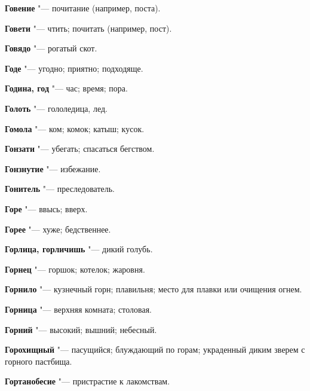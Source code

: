 \begin{mymulticols}{2}
\noindent\textbf{Говение} "--- почитание (например, поста). 




\noindent\textbf{Говети} "--- чтить; почитать (например, пост). 




\noindent\textbf{Говядо} "--- рогатый скот. 




\noindent\textbf{Годе} "--- угодно; приятно; подходяще. 




\noindent\textbf{Година, год} "--- час; время; пора. 




\noindent\textbf{Голоть} "--- гололедица, лед. 




\noindent\textbf{Гомола} "--- ком; комок; катыш; кусок. 




\noindent\textbf{Гонзати} "--- убегать; спасаться бегством. 




\noindent\textbf{Гонзнутие} "--- избежание. 




\noindent\textbf{Гонитель} "--- преследователь. 




\noindent\textbf{Горе} "--- ввысь; вверх. 




\noindent\textbf{Горее} "--- хуже; бедственнее. 




\noindent\textbf{Горлица, горличишь} "--- дикий голубь. 




\noindent\textbf{Горнец} "--- горшок; котелок; жаровня. 




\noindent\textbf{Горнило} "--- кузнечный горн; плавильня; место для плавки или очищения огнем. 




\noindent\textbf{Горница} "--- верхняя комната; столовая. 




\noindent\textbf{Горний} "--- высокий; вышний; небесный. 




\noindent\textbf{Горохищный} "--- пасущийся; блуждающий по горам; украденный диким зверем с горного пастбища. 




\noindent\textbf{Гортанобесие} "--- пристрастие к лакомствам. 





\end{mymulticols}
